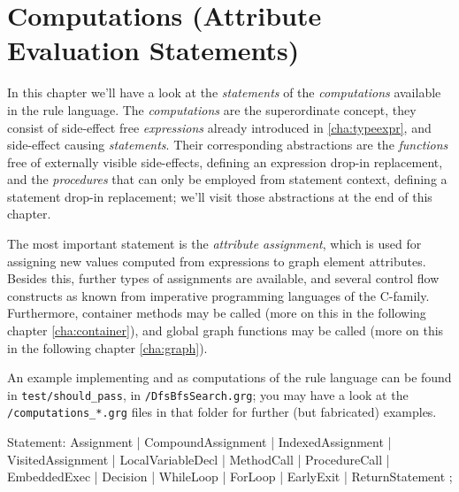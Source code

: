 \chapter{Computations (Attribute Evaluation Statements)}
\label{cha:computations}

In this chapter we'll have a look at the \emph{statements} of the \emph{computations} available in the rule language.
The \emph{computations} are the superordinate concept, they consist of side-effect free \emph{expressions} already introduced in \ref{cha:typeexpr}, and side-effect causing \emph{statements}.
Their corresponding abstractions are the \emph{functions} free of externally visible side-effects, defining an expression drop-in replacement, and the \emph{procedures} that can only be employed from statement context, defining a statement drop-in replacement; we'll visit those abstractions at the end of this chapter.

The most important statement is the \emph{attribute assignment}, which is used for assigning new values computed from expressions to graph element attributes.
Besides this, further types of assignments are available, and several control flow constructs as known from imperative programming languages of the C-family.
Furthermore, container methods may be called (more on this in the following chapter \ref{cha:container}), 
and global graph functions may be called (more on this in the following chapter \ref{cha:graph}).

An example implementing  and  as computations of the rule language can be found in \texttt{test/should\_pass}, in \texttt{/DfsBfsSearch.grg}; you may have a look at the \verb#/computations_*.grg# files in that folder for further (but fabricated) examples.

\begin{rail}
  Statement:
      Assignment
    | CompoundAssignment
    | IndexedAssignment
    | VisitedAssignment
    | LocalVariableDecl
    | MethodCall
    | ProcedureCall
    | EmbeddedExec
    | Decision
    | WhileLoop
    | ForLoop
    | EarlyExit
    | ReturnStatement
    ;
\end{rail}\label{computationstatemet}



